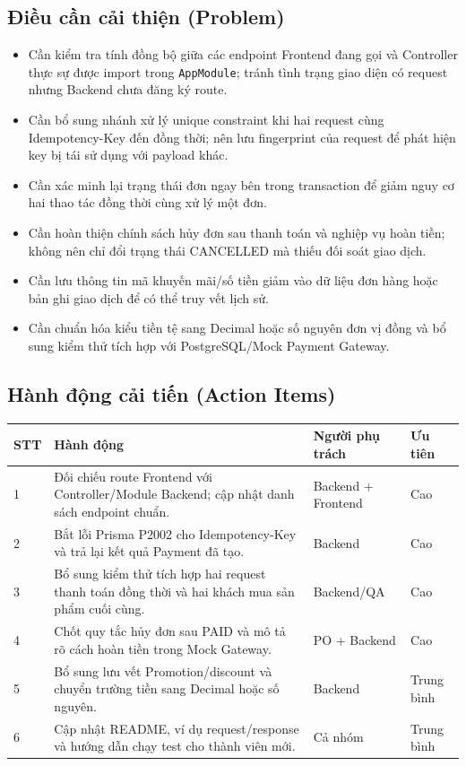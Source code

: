 \subsection{Điều cần cải thiện (Problem)}

\begin{itemize}
    \item Cần kiểm tra tính đồng bộ giữa các endpoint Frontend đang gọi và Controller thực sự được import trong \texttt{AppModule}; tránh tình trạng giao diện có request nhưng Backend chưa đăng ký route.
    \item Cần bổ sung nhánh xử lý unique constraint khi hai request cùng Idempotency-Key đến đồng thời; nên lưu fingerprint của request để phát hiện key bị tái sử dụng với payload khác.
    \item Cần xác minh lại trạng thái đơn ngay bên trong transaction để giảm nguy cơ hai thao tác đồng thời cùng xử lý một đơn.
    \item Cần hoàn thiện chính sách hủy đơn sau thanh toán và nghiệp vụ hoàn tiền; không nên chỉ đổi trạng thái CANCELLED mà thiếu đối soát giao dịch.
    \item Cần lưu thông tin mã khuyến mãi/số tiền giảm vào dữ liệu đơn hàng hoặc bản ghi giao dịch để có thể truy vết lịch sử.
    \item Cần chuẩn hóa kiểu tiền tệ sang Decimal hoặc số nguyên đơn vị đồng và bổ sung kiểm thử tích hợp với PostgreSQL/Mock Payment Gateway.
\end{itemize}

\subsection{Hành động cải tiến (Action Items)}

\begin{center}
\renewcommand{\arraystretch}{1.2}
\begin{tabular}{|p{1.0cm}|p{7.2cm}|p{3.0cm}|p{2.0cm}|}
\hline
\textbf{STT} & \textbf{Hành động} & \textbf{Người phụ trách} & \textbf{Ưu tiên} \\
\hline
1 & Đối chiếu route Frontend với Controller/Module Backend; cập nhật danh sách endpoint chuẩn. & Backend + Frontend & Cao \\
\hline
2 & Bắt lỗi Prisma P2002 cho Idempotency-Key và trả lại kết quả Payment đã tạo. & Backend & Cao \\
\hline
3 & Bổ sung kiểm thử tích hợp hai request thanh toán đồng thời và hai khách mua sản phẩm cuối cùng. & Backend/QA & Cao \\
\hline
4 & Chốt quy tắc hủy đơn sau PAID và mô tả rõ cách hoàn tiền trong Mock Gateway. & PO + Backend & Cao \\
\hline
5 & Bổ sung lưu vết Promotion/discount và chuyển trường tiền sang Decimal hoặc số nguyên. & Backend & Trung bình \\
\hline
6 & Cập nhật README, ví dụ request/response và hướng dẫn chạy test cho thành viên mới. & Cả nhóm & Trung bình \\
\hline
\end{tabular}
\end{center}

